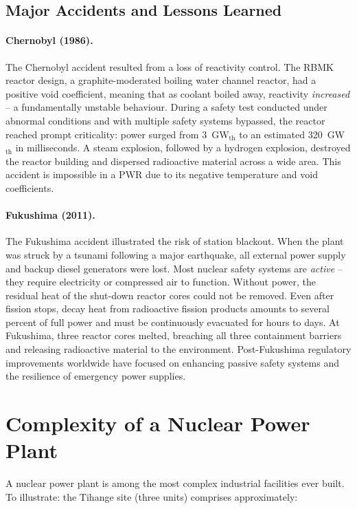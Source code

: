 \subsection{Major Accidents and Lessons Learned}

\paragraph{Chernobyl (1986).} The Chernobyl accident resulted from a loss of reactivity control. The RBMK reactor design, a graphite-moderated boiling water channel reactor, had a positive void coefficient, meaning that as coolant boiled away, reactivity \textit{increased} -- a fundamentally unstable behaviour. During a safety test conducted under abnormal conditions and with multiple safety systems bypassed, the reactor reached prompt criticality: power surged from 3~GW$_{\text{th}}$ to an estimated 320~GW$_{\text{th}}$ in milliseconds. A steam explosion, followed by a hydrogen explosion, destroyed the reactor building and dispersed radioactive material across a wide area. This accident is impossible in a PWR due to its negative temperature and void coefficients.

\paragraph{Fukushima (2011).} The Fukushima accident illustrated the risk of station blackout. When the plant was struck by a tsunami following a major earthquake, all external power supply and backup diesel generators were lost. Most nuclear safety systems are \textit{active} -- they require electricity or compressed air to function. Without power, the residual heat of the shut-down reactor cores could not be removed. Even after fission stops, decay heat from radioactive fission products amounts to several percent of full power and must be continuously evacuated for hours to days. At Fukushima, three reactor cores melted, breaching all three containment barriers and releasing radioactive material to the environment. Post-Fukushima regulatory improvements worldwide have focused on enhancing passive safety systems and the resilience of emergency power supplies.

\section{Complexity of a Nuclear Power Plant}

A nuclear power plant is among the most complex industrial facilities ever built. To illustrate: the Tihange site (three units) comprises approximately:

